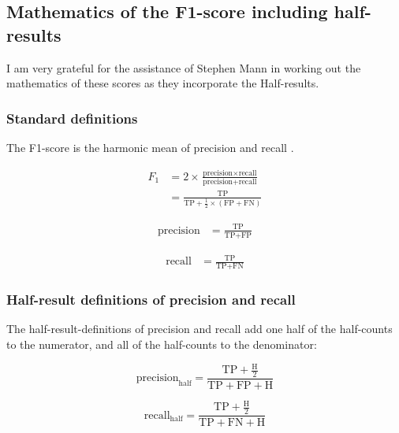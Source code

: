 \documentclass[a4paper,10pt]{article} %
\begin{document}
\subsection{Mathematics of the F1-score including half-results}
\label{math_supp}

I am very grateful for the assistance of Stephen Mann in working out the mathematics of these scores as they incorporate the Half-results.

\subsubsection{Standard definitions}\label{sec:standard}

The F1-score is the harmonic mean of precision and recall \citep{van1979information}.

\begin{align*}
    F_1 &= 2\times\frac{\text{precision}\times\text{recall}}
            {\text{precision} + \text{recall}}\\
        &= \frac{\text{TP}}
            {\text{TP}+\frac{1}{2}\times(\text{FP}+\text{FN})}
\end{align*}

\begin{align*}
    \text{precision} 
        &= \frac{\text{TP}}
            {\text{TP}+\text{FP}}
\end{align*}

\begin{align*}
    \text{recall} 
        &= \frac{\text{TP}}
            {\text{TP}+\text{FN}}
\end{align*}

\subsubsection{Half-result definitions of precision and recall}\label{sec:halfsies}

The half-result-definitions of precision and recall add one half of the half-counts to the numerator, and all of the half-counts to the denominator:

\begin{equation*}
    \text{precision}_{\text{half}} 
        = \frac{\text{TP}+\frac{\text{H}}{2}}
            {\text{TP}+\text{FP}+\text{H}}
\end{equation*}

\begin{equation*}
    \text{recall}_{\text{half}}
        = \frac{\text{TP}+\frac{\text{H}}{2}}
            {\text{TP}+\text{FN}+\text{H}}
\end{equation*}
\end{document}
